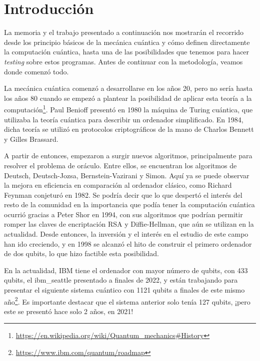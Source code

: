 \cleardoublepage

\chapter{Introducción}
\label{Cap1:Intro}
La memoria y el trabajo presentado a continuación nos mostrarán el recorrido desde los principio básicos de la mecánica cuántica y cómo definen directamente la computación cuántica, hasta una de las posibilidades que tenemos para hacer \textit{testing} sobre estos programas. Antes de continuar con la metodología, veamos donde comenzó todo. \newline

La mecánica cuántica comenzó a desarrollarse en los años 20, pero no sería hasta los años 80 cuando se empezó a plantear la posibilidad de aplicar esta teoría a la computación\cite{B:QuantumScientist:2008}\footnote{\url{https://en.wikipedia.org/wiki/Quantum_mechanics\#History}}. Paul Benioff presentó en 1980 la máquina de Turing cuántica, que utilizaba la teoría cuántica para describir un ordenador simplificado. En 1984, dicha teoría se utilizó en protocolos criptográficos de la mano de Charlos Bennett y Gilles Brassard. \newline

A partir de entonces, empezaron a surgir nuevos algoritmos, principalmente para resolver el problema de oráculo. Entre ellos,  se encuentran los algoritmos de Deutsch, Deutsch-Jozsa, Bernstein-Vazirani y Simon. Aquí ya se puede observar la mejora en eficiencia en comparación al ordenador clásico, como Richard Feynman conjeturó en 1982\cite{AR:Feynman:1982}. Se podría decir que lo que despertó el interés del resto de la comunidad en la importancia que podía tener la computación cuántica ocurrió gracias a Peter Shor en 1994, con sus algoritmos que podrían permitir romper las claves de encriptación RSA y Diffie-Hellman, que aún se utilizan en la actualidad. Desde entonces, la inversión y el interés en el estudio de este campo han ido creciendo, y en 1998 se alcanzó el hito de construir el primero ordenador de dos qubits, lo que hizo factible esta posibilidad.\newline 

En la actualidad, IBM tiene el ordenador con mayor número de qubits, con 433 qubits, el ibm\_seattle presentado a finales de 2022, y están trabajando para presentar el siguiente sistema cuántico con 1121 qubits a finales de este mismo año\footnote{\url{https://www.ibm.com/quantum/roadmap}}. Es importante destacar que el sistema anterior solo tenía 127 qubits, ¡pero este se presentó hace solo 2 años, en 2021! \newline

